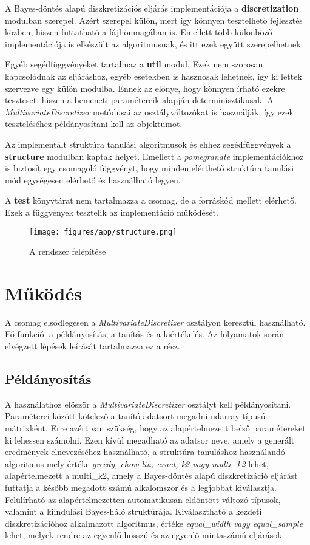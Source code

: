 A Bayes-döntés alapú diszkretizációs eljárás implementációja a \textbf{discretization} modulban szerepel. Azért szerepel külön, mert így könnyen tesztelhető fejlesztés közben, hiszen futtatható a fájl önmagában is. Emellett több különböző implementációja is elkészült az algoritmusnak, és itt ezek együtt szerepelhetnek.

Egyéb segédfüggvényeket tartalmaz a \textbf{util} modul. Ezek nem szorosan kapcsolódnak az eljáráshoz, egyéb esetekben is hasznosak lehetnek, így ki lettek szervezve egy külön modulba. Ennek az előnye, hogy könnyen írható ezekre teszteset, hiszen a bemeneti paramétereik alapján determinisztikusak. A \textit{MultivariateDiscretizer} metódusai az osztályváltozókat is használják, így ezek teszteléséhez példányosítani kell az objektumot.

Az implementált struktúra tanulási algoritmusok és ehhez segédfüggvények a \textbf{structure} modulban kaptak helyet. Emellett a \emph{pomegranate} implementációkhoz is biztosít egy csomagoló függvényt, hogy minden elérthető struktúra tanulási mód egységesen elérhető és használható legyen.

A \textbf{test} könyvtárat nem tartalmazza a csomag, de a forráskód mellett elérhető. Ezek a függvények tesztelik az implementáció működését.

\begin{figure}[htp]
    \centering
    \texttt{[image: figures/app/structure.png]}
    \caption{A rendszer felépítése}
    \label{fig:struktura-diagram}
\end{figure}


\section{Működés}
A csomag elsődlegesen a \emph{MultivariateDiscretizer} osztályon keresztül használható. Fő funkciói a példányosítás, a tanítás és a kiértékelés. Az folyamatok során elvégzett lépések leírását tartalmazza ez a rész.

\subsection{Példányosítás}
A használathoz először a \emph{MultivariateDiscretizer} osztályt kell példányosítani. Paraméterei között kötelező a tanító adatsort megadni ndarray típusú mátrixként. Erre azért van szükség, hogy az alapértelmezett belső paramétereket ki lehessen számolni. Ezen kívül megadható az adatsor neve, amely a generált eredmények elnevezéséhez használható, a struktúra tanuláshoz használandó algoritmus mely értéke \emph{greedy, chow-liu, exact, k2 vagy multi\_k2} lehet, alapértelmezett a multi\_k2, amely a Bayes-döntés alapú diszkretizáció eljárást futtatja a később megadott számú alkalomszor és a legjobbat kiválasztja. Felülírható az alapértelmezetten automatikusan eldöntött változó típusok, valamint a kiindulási Bayes-háló struktúrája. Kiválasztható a kezdeti diszkretizációhoz alkalmazott algoritmus, értéke \emph{equal\_width vagy equal\_sample} lehet, melyek rendre az egyenlő hosszú és az egyenlő mintaszámú eljárások.

